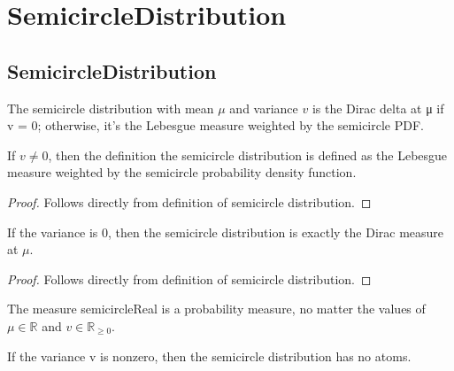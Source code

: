\chapter{SemicircleDistribution}

\section{SemicircleDistribution}

\begin{definition}
    \label{def:semicircle_distribution}
    \leanok
    The semicircle distribution with mean $\mu$ and variance $v$ is the Dirac delta at μ if v = 0; otherwise, it's the Lebesgue measure weighted by the semicircle PDF.
\end{definition}

\begin{lemma}
    \label{lemma:semicircleReal_of_var_ne_zero}
    \leanok
    If $v \neq 0$, then the definition the semicircle distribution is defined as the Lebesgue measure weighted by the semicircle probability density function.
\end{lemma}

\begin{proof}
    Follows directly from definition of semicircle distribution.
\end{proof}

\begin{lemma}
    \label{lemma:semicircleReal_zero_var}
    \leanok
    If the variance is 0, then the semicircle distribution is exactly the Dirac measure at $\mu$.
\end{lemma}

\begin{proof}
    Follows directly from definition of semicircle distribution.
\end{proof}

\begin{lemma} %
    \label{lemma:instIsProbabilityMeasuresemicircleReal}
    \leanok
    The measure semicircleReal is a probability measure, no matter the values of $\mu \in \mathbb{R}$ and $v \in \mathbb{R}_{\ge 0}$.
\end{lemma}


\begin{lemma}
    \label{lemma:noAtoms_semicircleReal}
    \leanok
    If the variance v is nonzero, then the semicircle distribution has no atoms.
\end{lemma}

